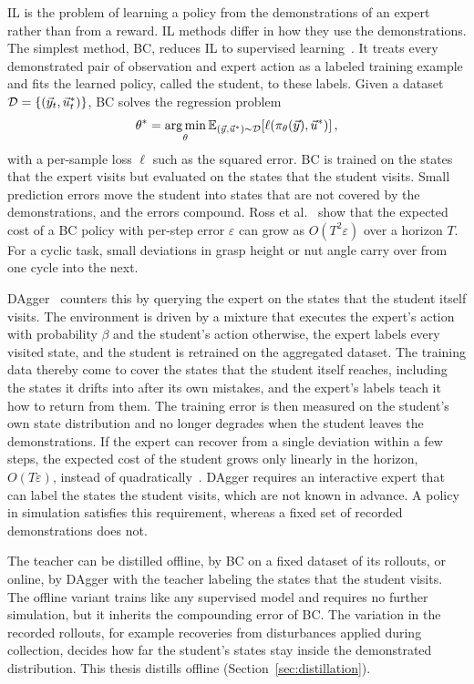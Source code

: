 \Ac{IL} is the problem of learning a policy from the demonstrations of an expert rather than from a reward. \Ac{IL} methods differ in how they use the demonstrations. The simplest method, \ac{BC}, reduces \ac{IL} to supervised learning~\cite{Ross2011}. It treats every demonstrated pair of observation and expert action as a labeled training example and fits the learned policy, called the student, to these labels. Given a dataset $\mathcal{D}=\{(\vec{y}_t,\vec{u}^{*}_t)\}$, \ac{BC} solves the regression problem
\begin{equation}\label{eq:bc}
  \theta^{*}=\argmin_\theta \E_{(\obs,\act^{*})\sim\Dset}\!\left[\ell\!\left(\piS(\obs),\act^{*}\right)\right],
\end{equation}
with a per-sample loss $\ell$ such as the squared error. \ac{BC} is trained on the states that the expert visits but evaluated on the states that the student visits. Small prediction errors move the student into states that are not covered by the demonstrations, and the errors compound. Ross et al.~\cite{Ross2011} show that the expected cost of a \ac{BC} policy with per-step error $\varepsilon$ can grow as $O(T^2\varepsilon)$ over a horizon $T$. For a cyclic task, small deviations in grasp height or nut angle carry over from one cycle into the next.

\Ac{DAgger}~\cite{Ross2011} counters this by querying the expert on the states that the student itself visits. The environment is driven by a mixture that executes the expert's action with probability $\beta$ and the student's action otherwise, the expert labels every visited state, and the student is retrained on the aggregated dataset. The training data thereby come to cover the states that the student itself reaches, including the states it drifts into after its own mistakes, and the expert's labels teach it how to return from them. The training error is then measured on the student's own state distribution and no longer degrades when the student leaves the demonstrations. If the expert can recover from a single deviation within a few steps, the expected cost of the student grows only linearly in the horizon, $O(T\varepsilon)$, instead of quadratically~\cite{Ross2011}. \ac{DAgger} requires an interactive expert that can label the states the student visits, which are not known in advance. A policy in simulation satisfies this requirement, whereas a fixed set of recorded demonstrations does not.

The teacher can be distilled offline, by \ac{BC} on a fixed dataset of its rollouts, or online, by \ac{DAgger} with the teacher labeling the states that the student visits. The offline variant trains like any supervised model and requires no further simulation, but it inherits the compounding error of \ac{BC}. The variation in the recorded rollouts, for example recoveries from disturbances applied during collection, decides how far the student's states stay inside the demonstrated distribution. This thesis distills offline (Section~\ref{sec:distillation}).

